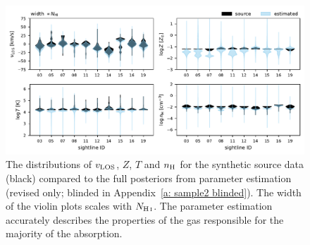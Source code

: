 \documentclass[fleqn,usenatbib]{mnras}
\begin{document}
\begin{figure}
    \centering
    \includegraphics[width=\textwidth]{figures/sample2/violin_rerun.pdf}
    \caption{
    The distributions of $v_{\rm LOS}$, $Z$, $T$ and $n_{\rm H}$ for the synthetic source data (black) compared to the full posteriors from parameter estimation (revised only; blinded in Appendix~\ref{a: sample2 blinded}).
    The width of the violin plots scales with $N_{\ion{H}{I}}$.
    The parameter estimation accurately describes the properties of the gas responsible for the majority of the absorption.
    }
    \label{f: sample2 violin}
\end{figure}
\end{document}
